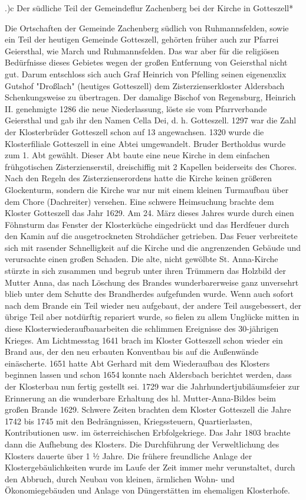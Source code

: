 .)c Der südliche Teil der Gemeindeflur Zachenberg bei der Kirche in Gotteszell*

Die Ortschaften der Gemeinde Zachenberg südlich von Ruhmannsfelden, sowie ein
Teil der heutigen Gemeinde Gotteszell, gehörten früher auch zur Pfarrei
Geiersthal, wie March und Ruhmannsfelden. Das war aber für die religiösen
Bedürfnisse dieses Gebietes wegen der großen Entfernung von Geiersthal nicht
gut. Darum entschloss sich auch Graf Heinrich von Pfelling seinen eigenenxlix
Gutshof "Droßlach" (heutiges Gotteszell) dem Zisterzienserkloster Aldersbach
Schenkungsweise zu übertragen. Der damalige Bischof von Regensburg, Heinrich II.
genehmigte 1286 die neue Niederlassung, löste sie vom Pfarrverbande Geiersthal
und gab ihr den Namen Cella Dei, d. h. Gotteszell. 1297 war die Zahl der
Klosterbrüder Gotteszell schon auf 13 angewachsen. 1320 wurde die Klosterfiliale
Gotteszell in eine Abtei umgewandelt. Bruder Bertholdus wurde zum 1. Abt
gewählt. Dieser Abt baute eine neue Kirche in dem einfachen frühgotischen
Zisterzienserstil, dreischiffig mit 2 Kapellen beiderseits des Chores. Nach den
Regeln des Zisterzienserordens hatte die Kirche keinen größeren Glockenturm,
sondern die Kirche war nur mit einem kleinen Turmaufbau über dem Chore
(Dachreiter) versehen. Eine schwere Heimsuchung brachte dem Kloster Gotteszell
das Jahr 1629. Am 24. März dieses Jahres wurde durch einen Föhnsturm das Fenster
der Klosterküche eingedrückt und das Herdfeuer durch den Kamin auf die
ausgetrockneten Strohdächer getrieben. Das Feuer verbreitete sich mit rasender
Schnelligkeit auf die Kirche und die angrenzenden Gebäude und verursachte einen
großen Schaden. Die alte, nicht gewölbte St. Anna-Kirche stürzte in sich
zusammen und begrub unter ihren Trümmern das Holzbild der Mutter Anna, das nach
Löschung des Brandes wunderbarerweise ganz unversehrt blieb unter dem Schutte
des Brandherdes aufgefunden wurde. Wenn auch sofort nach dem Brande ein Teil
wieder neu aufgebaut, der andere Teil ausgebessert, der übrige Teil aber
notdürftig repariert wurde, so fielen zu allem Unglücke mitten in diese
Klosterwiederaufbauarbeiten die schlimmen Ereignisse des 30-jährigen Krieges. Am
Lichtmesstag 1641 brach im Kloster Gotteszell schon wieder ein Brand aus, der
den neu erbauten Konventbau bis auf die Außenwände einäscherte. 1651 hatte Abt
Gerhard mit dem Wiederaufbau des Klosters beginnen lassen und schon 1654 konnte
nach Aldersbach berichtet werden, dass der Klosterbau nun fertig gestellt sei.
1729 war die Jahrhundertjubiläumsfeier zur Erinnerung an die wunderbare
Erhaltung des hl. Mutter-Anna-Bildes beim großen Brande 1629. Schwere Zeiten
brachten dem Kloster Gotteszell die Jahre 1742 bis 1745 mit den Bedrängnissen,
Kriegssteuern, Quartierlasten, Kontributionen usw. im österreichischen
Erbfolgekriege. Das Jahr 1803 brachte dann die Aufhebung des Klosters. Die
Durchführung der Verweltlichung des Klosters dauerte über 1 ½ Jahre. Die frühere
freundliche Anlage der Klostergebäulichkeiten wurde im Laufe der Zeit immer mehr
verunstaltet, durch den Abbruch, durch Neubau von kleinen, ärmlichen Wohn- und
Ökonomiegebäuden und Anlage von Düngerstätten im ehemaligen Klosterhofe.

